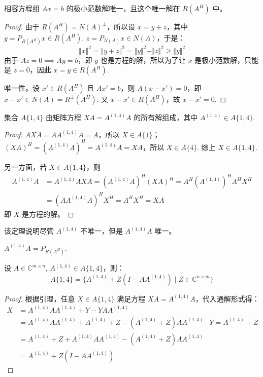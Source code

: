 \begin{lemma}[极小范数解]
相容方程组 $Ax=b$ 的极小范数解唯一，且这个唯一解在 $R(A^H)$ 中。
\end{lemma}
\begin{proof}
由于 $R(A^H)=N(A)^\perp$，所以设 $x=y+z$，其中 $y=P_{R(A^H)}x\in R(A^H),\,z=P_{N(A)}x\in N(A)$，于是：
\[
    \Vert x\Vert^2=\Vert y+z\Vert^2=\Vert y\Vert^2+\Vert z\Vert^2\geq \Vert y\Vert^2
\]
由于 $Az=0\implies Ay=b$，即 $y$ 也是方程的解，所以为了让 $x$ 是极小范数解，只能是 $z=0$，因此 $x=y\in R(A^H)$.

唯一性。设 $x'\in R(A^H)$ 且 $Ax'=b$，则 $A(x-x')=0$，即 $x-x'\in N(A)=R^{\perp}(A^H)$.  又 $x-x'\in R(A^H)$，故 $x-x'=0$.
\end{proof}

\begin{lemma}
集合 $A\{1,4\}$ 由矩阵方程 $XA=A^{(1,4)}A$ 的所有解组成，其中 $A^{(1,4)}\in A\{1,4\}$.
\end{lemma}
\begin{proof}
$AXA=AA^{(1,4)}A=A$，所以 $X\in A\{1\}$；$(XA)^H=(A^{(1,4)}A)^H=A^{(1,4)}A=XA$，所以 $X\in A\{4\}$.  综上 $X\in A\{1,4\}$.

另一方面，若 $X\in A\{1,4\}$，则
\begin{align*}
    A^{(1,4)}A&=A^{(1,4)}AXA=(A^{(1,4)}A)^H(XA)^H=A^H(A^{(1,4)})^HA^HX^H\\
    &=(AA^{(1,4)}A)^HX^H=A^HX^H=XA
\end{align*}
即 $X$ 是方程的解。
\end{proof}

\begin{remark}
该定理说明尽管 $A^{(1,4)}$ 不唯一，但是 $A^{(1,4)}A$ 唯一。
\end{remark}

\begin{corollary}
$A^{(1,4)}A=P_{R(A^H)}$.
\end{corollary}

\begin{theorem}
设 $A\in\mathbb C^{m\times n},\,A^{(1,4)}\in A\{1,4\}$，则：
\[
    A\{1,4\}=\{A^{(1,4)}+Z(I-AA^{(1,4)})\mid Z\in\mathbb C^{n\times m}\}
\]
\end{theorem}
\begin{proof}
根据引理，任意 $X\in A\{1,4\}$ 满足方程 $XA=A^{(1,4)}A$，代入通解形式得：
\begin{align*}
    X&=A^{(1,4)}AA^{(1,4)}+Y-YAA^{(1,4)}\\
    &=A^{(1,4)}AA^{(1,4)}+A^{(1,4)}+Z-(A^{(1,4)}+Z)AA^{(1,4)}&Y=A^{(1,4)}+Z\\
    &=A^{(1,4)}+Z+A^{(1,4)}AA^{(1,4)}-(A^{(1,4)}+Z)AA^{(1,4)}\\
    &=A^{(1,4)}+Z(I-AA^{(1,4)})
\end{align*}
\end{proof}

